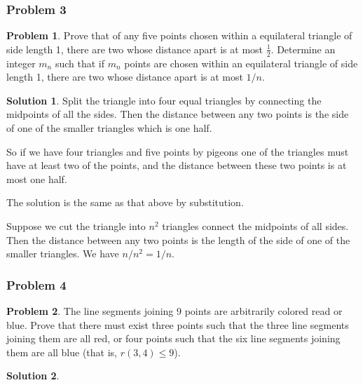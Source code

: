 \documentclass[10pt,a4paper,titlepage,twoside,draft]{article}
\theoremstyle{plain}
\theoremstyle{definition}
\newtheorem*{prob}{Problem}
\newtheorem*{sol}{Solution}
\theoremstyle{remark}
\begin{document}
\subsubsection{Problem 3}

\begin{prob}
Prove that of any five points chosen within a equilateral triangle of side length 1, there are two whose distance apart is at most $\frac{1}{2}$.
Determine an integer $m_n$ such that if $m_n$ points are chosen within an equilateral triangle of side length 1, there are two whose distance apart is at most $1/n$.
\end{prob}

\medskip

\begin{sol}
Split the triangle into four equal triangles by connecting the midpoints of all the sides.  Then the distance between any two points is the side of one of the smaller triangles which is one half. 
     
So if we have four triangles and five points by pigeons one of the triangles must have at least two of the points, and the distance between these two points is at most one half.
    
\medskip

The solution is the same as that above by substitution.
    
Suppose we cut the triangle into $n^{2}$ triangles connect the midpoints of all sides. Then the distance between any two points is the length of the side of one of the smaller triangles. We have $n/n^{2} = 1/n$.
\end{sol}  


\subsubsection{Problem 4}

\begin{prob}
The line segments joining 9 points are arbitrarily colored read or blue. Prove that there must exist three points such that the three line segments joining them are all red, or four points such that the six line segments joining them are all blue (that is, $r(3,4) \leq 9$).
\end{prob}

\medskip

\begin{sol}

\end{sol}
\end{document}
